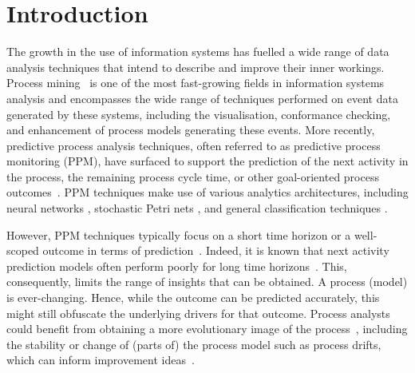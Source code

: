 \section{Introduction}\label{sec:introduction}

The growth in the use of information systems has fuelled a wide range of data analysis techniques that intend to describe and improve their inner workings.
Process mining~\cite{van2016data} is one of the most fast-growing fields in information systems analysis and encompasses the wide range of techniques performed on event data generated by these systems, including the visualisation, conformance checking, and enhancement of process models generating these events.
More recently, predictive process analysis techniques, often referred to as predictive process monitoring (PPM), have surfaced to support the prediction of the next activity in the process, the remaining process cycle time, or other goal-oriented process outcomes~\cite{DBLP:conf/bpm/Francescomarino18}.
PPM techniques make use of various analytics architectures, including neural networks \cite{DBLP:conf/caise/TaxVRD17}, stochastic Petri nets \cite{DBLP:conf/icsoc/Rogge-SoltiW13}, and general classification techniques \cite{DBLP:journals/tkdd/TeinemaaDRM19}.

However, PPM techniques typically focus on a short time horizon or a well-scoped outcome in terms of prediction~\cite{DBLP:journals/tkdd/TeinemaaDRM19}.
Indeed, it is known that next activity prediction models often perform poorly for long time horizons~\cite{park2020predicting}.
This, consequently, limits the range of insights that can be obtained. 
A process (model) is ever-changing. Hence, while the outcome can be predicted accurately, this might still obfuscate the underlying drivers for that outcome.
Process analysts could benefit from obtaining a more evolutionary image of the process~\cite{DBLP:conf/bpm/PollPRRR18}, including the stability or change of (parts of) the process model such as process drifts, which can inform improvement ideas~\cite{van2015pm}. 


